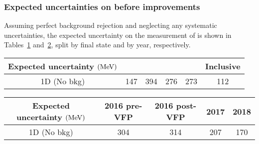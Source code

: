 \subsubsection{Expected uncertainties on \mH before improvements}
Assuming perfect background rejection and neglecting any systematic uncertainties, the expected uncertainty on the measurement of \mH is shown in Tables~\ref{table:1D_model_result_fs} and~\ref{table:1D_model_result_year}, split by final state and by year, respectively.
\begin{table}[!ht]
    \centering
	\begin{tabular}{|cccccc|}
            \hline      
        Expected uncertainty $(\text{Me\hspace{-.08em}V})$	&	\fourmu	&	\foure	&	\twoetwomu	& \twomutwoe	& Inclusive	\\
            \hline
        1D	(No bkg) &	147	&	394	&	276	&	273	&	112	\\
            \hline
        \end{tabular}
    \label{table:1D_model_result_fs}
\end{table}
\begin{table}[!ht]
    \centering
	\begin{tabular}{|ccccc|}
            \hline      
        Expected uncertainty $(\text{Me\hspace{-.08em}V})$	&	2016 pre-VFP	&	2016 post-VFP	&	2017	&	2018	\\
            \hline
        1D (No bkg)	&	304	&	314	&	207	&	170	\\
            \hline
        \end{tabular}
    \label{table:1D_model_result_year}
\end{table}
